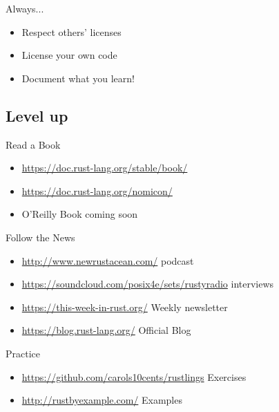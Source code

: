 \documentclass[50pt]{beamer}
\begin{document}
    \begin{frame}
        Always...
        \begin{itemize}
            \item Respect others' licenses
            \item License your own code
            \item Document what you learn!
        \end{itemize}
    \end{frame}


\subsection{Level up}

    \begin{frame}
        Read a Book
        \begin{itemize}
            \item \url{https://doc.rust-lang.org/stable/book/}
            \item \url{https://doc.rust-lang.org/nomicon/}
            \item O'Reilly Book coming soon
        \end{itemize}
    \end{frame}

    \begin{frame}
        Follow the News
        \begin{itemize}
            \item \url{http://www.newrustacean.com/} podcast
            \item \url{https://soundcloud.com/posix4e/sets/rustyradio} interviews
            \item \url{https://this-week-in-rust.org/} Weekly newsletter
            \item \url{https://blog.rust-lang.org/} Official Blog
        \end{itemize}
    \end{frame}

    \begin{frame}
        Practice
        \begin{itemize}
            \item \url{https://github.com/carols10cents/rustlings} Exercises
            \item \url{http://rustbyexample.com/} Examples
        \end{itemize}
    \end{frame}
\end{document}
